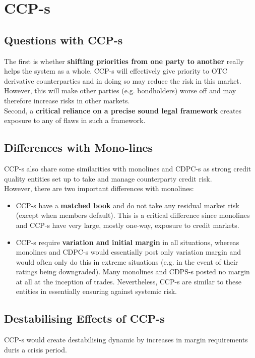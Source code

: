 \section{CCP-s}

\subsection{Questions with CCP-s}
The first is whether \textbf{\color{blue}shifting priorities from one party to another} really helps the system as a whole. CCP-s will effectively give priority to OTC derivative counterparties and in doing so may reduce the risk in this market. However, this will make other parties (e.g. bondholders) worse off and may therefore increase risks in other markets.\\
Second, a \textbf{\color{blue}critical reliance on a precise sound legal framework} creates exposure to any of flaws in such a framework.

\subsection{Differences with Mono-lines}
CCP-s also share some similarities with monolines and CDPC-s as strong credit quality entities set up to take and manage counterparty credit risk.\\
However, there are two important differences with monolines:
\begin{itemize}
	\item CCP-s have a \textbf{\color{blue}matched book} and do not take any residual market risk (except when members default). This is a critical difference since monolines and CCP-s have very large, mostly one-way, exposure to credit markets.
	\item CCP-s require \textbf{\color{blue}variation and initial margin} in all situations, whereas monolines and CDPC-s would essentially post only variation margin and would often only do this in extreme situations (e.g. in the event of their ratings being downgraded). Many monolines and CDPS-s posted no margin at all at the inception of trades. Nevertheless, CCP-s are similar to these entities in essentially ensuring against systemic risk.
\end{itemize}

\subsection{Destabilising Effects of CCP-s}
CCP-s would create destabilising dynamic by increases in margin requirements duris a crisis period.

